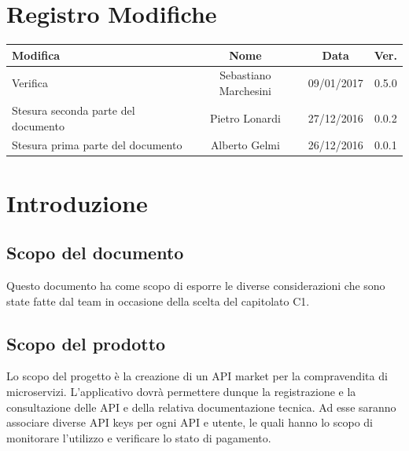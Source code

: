 \documentclass[12pt,a4paper,titlepage]{article}
\renewcommand{\headrulewidth}{0.4pt}
\renewcommand{\footrulewidth}{0.4pt}
\begin{document}
	
	
	\clearpage %
	

\chead{}
\cfoot{}
\rfoot{\thepage}
\renewcommand{\headrulewidth}{0.2pt}
\renewcommand{\footrulewidth}{0.2pt}

\section{Registro Modifiche}
\small %
{\renewcommand\arraystretch{1.2}  %
\begin{tabular}{|l|c|c|c|}
\hline
{\textbf{Modifica}}&{\textbf{Nome}}&{\textbf{Data}}&{\textbf{Ver.}}\\
\hline
Verifica & Sebastiano Marchesini & 09/01/2017 & 0.5.0 \\
\hline
Stesura seconda parte del documento & Pietro Lonardi & 27/12/2016 & 0.0.2 \\
\hline
Stesura prima parte del documento & Alberto Gelmi & 26/12/2016 & 0.0.1 \\
\hline

\end{tabular}
}

\newpage

\tableofcontents
\thispagestyle{empty}

\newpage


\section{Introduzione}

\subsection{Scopo del documento}
Questo documento ha come scopo di esporre le diverse considerazioni che sono state fatte dal team in occasione della scelta del capitolato C1.

\subsection{Scopo del prodotto}
Lo scopo del progetto è la creazione di un API market per la compravendita di microservizi. L'applicativo dovrà permettere dunque la registrazione e la consultazione delle API e della relativa documentazione tecnica. Ad esse saranno associare diverse API keys per ogni API e utente, le quali hanno lo scopo di monitorare l'utilizzo e verificare lo stato di pagamento.
\end{document}
